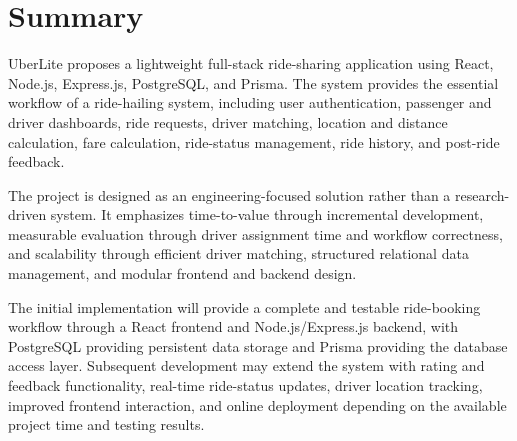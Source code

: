 \documentclass[11pt,a4paper]{article}
\begin{document}
\section{Summary}

UberLite proposes a lightweight full-stack ride-sharing application
using React, Node.js, Express.js, PostgreSQL, and Prisma. The system
provides the essential workflow of a ride-hailing system, including
user authentication, passenger and driver dashboards, ride requests,
driver matching, location and distance calculation, fare calculation,
ride-status management, ride history, and post-ride feedback.

The project is designed as an engineering-focused solution rather
than a research-driven system. It emphasizes time-to-value through
incremental development, measurable evaluation through driver
assignment time and workflow correctness, and scalability through
efficient driver matching, structured relational data management,
and modular frontend and backend design.

The initial implementation will provide a complete and testable
ride-booking workflow through a React frontend and Node.js/Express.js
backend, with PostgreSQL providing persistent data storage and
Prisma providing the database access layer. Subsequent development
may extend the system with rating and feedback functionality,
real-time ride-status updates, driver location tracking, improved
frontend interaction, and online deployment depending on the
available project time and testing results.
\end{document}
